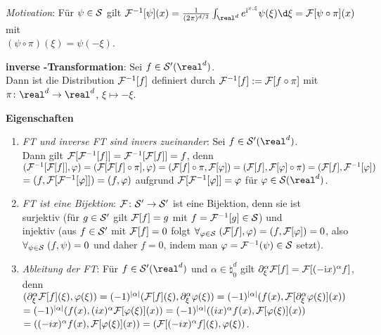 \linie

\emph{Motivation}:
Für $\psi \in \S$ gilt $\F^{-1}[\psi](x) =
\frac{1}{(2\pi)^{d/2}} \int_{\real^d} e^{\i\sp{x, \xi}}\psi(\xi)\d\xi =
\F[\psi \circ \pi](x)$ mit\\
$(\psi \circ \pi)(\xi) = \psi(-\xi)$.

\textbf{inverse -Transformation}:
Sei $f \in \S'(\real^d)$.\\
Dann ist die Distribution $\F^{-1}[f]$ definiert durch
$\F^{-1}[f] := \F[f \circ \pi]$ mit $\pi\colon \real^d \rightarrow \real^d$,
$\xi \mapsto -\xi$.

\linie

\textbf{Eigenschaften}
\begin{enumerate}
    \item
    \emph{FT und inverse FT sind invers zueinander}:
    Sei $f \in \S'(\real^d)$.\\
    Dann gilt $\F[\F^{-1}[f]] = \F^{-1}[\F[f]] = f$, denn\\
    $(\F^{-1}[\F[f]], \varphi) =
    (\F[\F[f] \circ \pi], \varphi) =
    (\F[f] \circ \pi, \F[\varphi]) =
    (\F[f], \F[\varphi] \circ \pi) =
    (\F[f], \F^{-1}[\varphi])$\\
    $= (f, \F[\F^{-1}[\varphi]]) =
    (f, \varphi)$
    aufgrund $\F[\F^{-1}[\varphi]] = \varphi$ für $\varphi \in \S(\real^d)$.
    
    \item
    \emph{FT ist eine Bijektion}:
    $\F\colon \S' \rightarrow \S'$ ist eine Bijektion, denn sie ist\\
    surjektiv
    (für $g \in \S'$ gilt $\F[f] = g$ mit $f = \F^{-1}[g] \in \S$) und\\
    injektiv
    (aus $f \in \S'$ mit $\F[f] = 0$ folgt
    $\forall_{\varphi \in \S}\; (\F[f], \varphi) = (f, \F[\varphi]) = 0$,
    also\\
    $\forall_{\psi \in \S}\; (f, \psi) = 0$ und daher $f = 0$,
    indem man $\varphi = \F^{-1}(\psi) \in \S$ setzt).
    
    \item
    \emph{Ableitung der FT}:
    Für $f \in \S'(\real^d)$ und $\alpha \in \natural_0^d$ gilt
    $\partial_\xi^\alpha \F[f] = \F[(-\i x)^\alpha f]$, denn\\
    $(\partial_\xi^\alpha \F[f](\xi), \varphi(\xi)) =
    (-1)^{|\alpha|} (\F[f](\xi), \partial_\xi^\alpha \varphi(\xi)) =
    (-1)^{|\alpha|} (f(x), \F[\partial_\xi^\alpha \varphi(\xi)](x))$\\
    $= (-1)^{|\alpha|} (f(x), (ix)^\alpha \F[\varphi(\xi)](x)) =
    (-1)^{|\alpha|} ((ix)^\alpha f(x), \F[\varphi(\xi)](x))$\\
    $= ((-ix)^\alpha f(x), \F[\varphi(\xi)](x)) =
    (\F[(-ix)^\alpha f](\xi), \varphi(\xi))$.
    

\end{enumerate}
